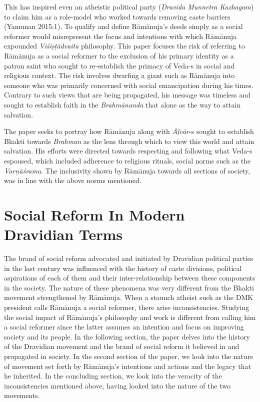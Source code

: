This has inspired even an atheistic political party (\textit{Dravida Munnetra Kazhagam}) to claim him as a role-model who worked towards removing caste barriers (Yamunan 2015:1). To qualify and define Rāmānuja’s deeds simply as a social reformer would misrepresent the focus and intentions with which Rāmānuja expounded \textit{Viśiṣṭādvaita} philosophy. This paper focuses the risk of referring to Rāmānuja as a social reformer to the exclusion of his primary identity as a patron saint who sought to re-establish the primacy of Veda-s in social and religious context. The risk involves dwarfing a giant such as Rāmānuja into someone who was primarily concerned with social emancipation during his times. Contrary to such views that are being propagated, his message was timeless and sought to establish faith in the \textit{Brahmānanda} that alone as the way to attain salvation.

The paper seeks to portray how Rāmānuja along with \textit{Āḷvār}-s sought to establish Bhakti towards \textit{Brahman }as the lens through which to view this world and attain salvation. His efforts were directed towards respecting and following what Veda-s espoused, which included adherence to religious rituals, social norms such as the \textit{Varņāśrama}. The inclusivity shown by Rāmānuja towards all sections of society, was in line with the above norms mentioned.


\section*{Social Reform In Modern Dravidian Terms}

\vskip -6pt

The brand of social reform advocated and initiated by Dravidian political parties in the last century was influenced with the history of caste divisions, political aspirations of each of them and their inter-relationship between these components in the society. The nature of these phenomena was very different from the Bhakti movement strengthened by Rāmānuja. When a staunch atheist such as the DMK president calls Rāmānuja a social reformer, there arise inconsistencies. Studying the social impact of Rāmānuja’s philosophy and work is different from calling him a social reformer since the latter assumes an intention and focus on improving society and its people. In the following section, the paper delves into the history of the Dravidian movement and the brand of social reform it believed in and propagated in society. In the second section of the paper, we look into the nature of movement set forth by Rāmānuja’s intentions and actions and the legacy that he inherited. In the concluding section, we look into the veracity of the inconsistencies mentioned above, having looked into the nature of the two movements.

